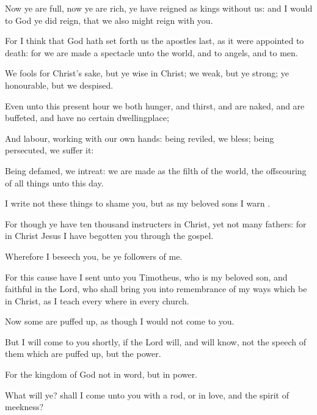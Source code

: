 {Now ye
are
full,
now ye are
rich, ye have reigned as
kings
without
us:
and I would to
God ye did
reign,
that
we
also might
reign with
you.

For I
think
that
God hath set
forth
us the
apostles
last, as it
were appointed to
death:
for we are
made a
spectacle unto the
world,
and to
angels,
and to
men.

We
{}
fools
for
Christ’s sake,
but
ye
{}
wise
in
Christ;
we
{}
weak,
but
ye
{}
strong;
ye
{}
honourable,
but
we
{}
despised.

Even
unto this
present
hour
we
both
hunger,
and
thirst,
and are
naked,
and are
buffeted,
and have no certain
dwellingplace;

And
labour,
working with our
own
hands: being
reviled, we
bless; being
persecuted, we suffer
it:

Being
defamed, we
intreat: we are
made
as the
filth of the
world,
{} the
offscouring of all
things
unto this
day.

I
write
not these
things to
shame
you,
but
as
my
beloved
sons I
warn
{}.

For
though ye
have ten
thousand
instructers
in
Christ,
yet
{}
not
many
fathers:
for
in
Christ
Jesus
I have
begotten
you
through the
gospel.

Wherefore I
beseech
you, be
ye
followers of
me.

For this
cause have I
sent unto
you
Timotheus,
who
is
my
beloved
son,
and
faithful
in the
Lord,
who shall
bring
you into
remembrance of
my
ways which
be
in
Christ,
as I
teach every
where
in
every
church.

Now
some are puffed
up, as
though
I
would
not
come
to
you.

But I will
come
to
you
shortly,
if the
Lord
will,
and will
know,
not the
speech of them
which are puffed
up,
but the
power.

For the
kingdom of
God
{}
not
in
word,
but
in
power.

What will
ye? shall I
come
unto
you
with a
rod,
or
in
love,
and
{} the
spirit of
meekness?




\par }
